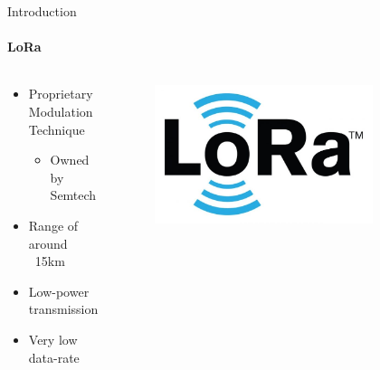 \begin{frame}{Introduction}
\framesubtitle{LoRa}
\begin{columns}
\begin{column}{0.5\textwidth}
\begin{itemize}
  \item Proprietary Modulation Technique
  \begin{itemize}
    \item Owned by Semtech
  \end{itemize}
  \item Range of around ~15km
  \item Low-power transmission
  \item Very low data-rate
\end{itemize}
\end{column}
\begin{column}{0.5\textwidth}
\begin{figure}
\includegraphics[width=0.8\textwidth]{presentation.tex/fig/lora.jpg}
\end{figure}
\end{column}
\end{columns}
\end{frame}


